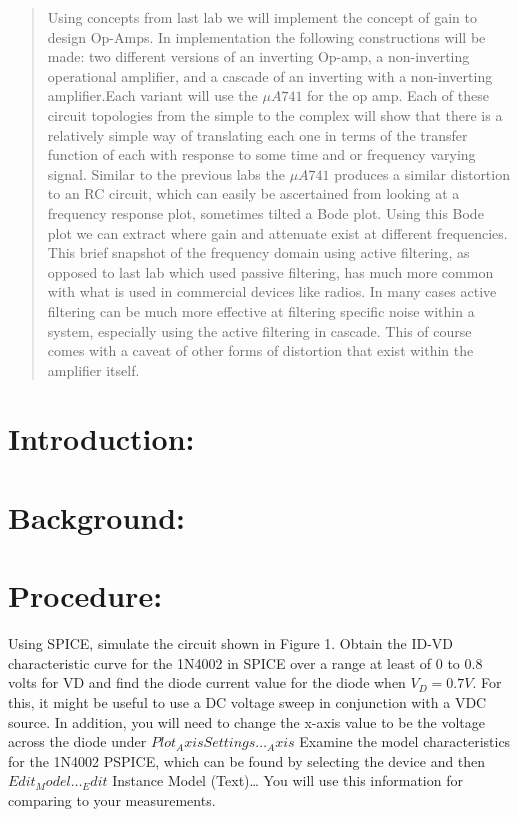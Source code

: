 \documentclass[10pt,a4paper]{article}
\begin{document}
\begin{titlepage}
\begin{abstract}
Using concepts from last lab we will implement the concept of gain to design Op-Amps. In implementation the following constructions will be made: two different versions of an inverting Op-amp, a non-inverting operational amplifier, and a cascade of an inverting with a non-inverting amplifier.Each variant will use the $\mu A741$ for the op amp.  Each of these circuit topologies  from the simple to the complex will show that there is a relatively simple way of translating each one in terms of the transfer function of each with response to some time and or frequency varying signal. Similar to the previous labs the $\mu A741$ produces a similar distortion to an RC circuit, which can easily be ascertained from looking at a frequency response plot, sometimes tilted a Bode plot. Using this Bode plot we can extract where gain and attenuate exist at different frequencies. This brief snapshot of the frequency domain using active filtering, as opposed to last lab which used passive filtering, has much more common with what is used in commercial devices like radios. In many cases active filtering can be much more effective at filtering specific noise within a system, especially using the active filtering in cascade. This of course comes with a caveat of other forms of distortion that exist within the amplifier itself.
\end{abstract}
\vfill %

\end{titlepage}





\section*{Introduction:}

\section*{Background:}
\section*{Procedure:}
Using SPICE, simulate the circuit  shown in  Figure 1.  Obtain the ID-VD characteristic curve for the 1N4002 in SPICE  over a range at least of 0 to 0.8 volts for VD and  find the diode current value for the  diode when $V_{D} = 0.7V$.  For this, it might be useful to use a DC voltage sweep in conjunction with a VDC source. In addition, you will need to change the x-axis value to be the voltage across the diode under $ Plot_Axis Settings…_Axis$ 
Examine the model characteristics for the 1N4002 PSPICE, which can be
found by selecting the device and then $Edit_Model…_Edit$ Instance Model (Text)…  You 	will use 	this 	information for comparing to your measurements.
 
\end{document}
